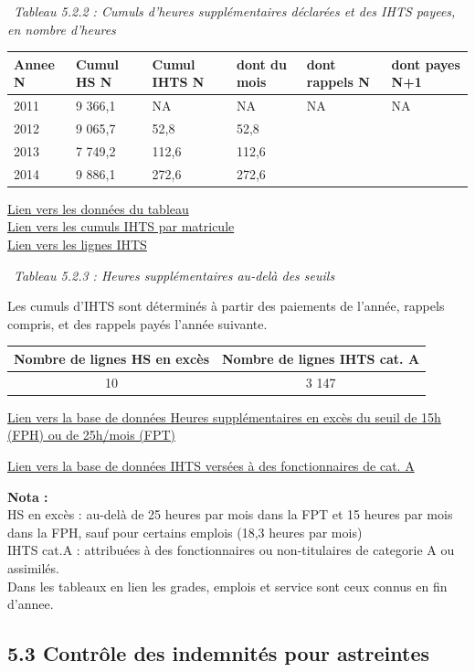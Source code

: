 ~\emph{Tableau 5.2.2 : Cumuls d'heures supplémentaires déclarées et des
IHTS payees, en nombre d'heures}

\begin{longtable}[]{@{}llllll@{}}
\toprule
Annee N & Cumul HS N & Cumul IHTS N & dont du mois & dont rappels N &
dont payes N+1\tabularnewline
\midrule
\endhead
2011 & 9 366,1 & NA & NA & NA & NA\tabularnewline
2012 & 9 065,7 & 52,8 & 52,8 & &\tabularnewline
2013 & 7 749,2 & 112,6 & 112,6 & &\tabularnewline
2014 & 9 886,1 & 272,6 & 272,6 & &\tabularnewline
\bottomrule
\end{longtable}

\href{../Bases/Reglementation/CumHS.csv}{Lien vers les données du
tableau}\\
\href{../Bases/Reglementation/lignes.IHTS.tot.csv}{Lien vers les cumuls
IHTS par matricule}\\
\href{../Bases/Reglementation/lignes.IHTS.csv}{Lien vers les lignes IHTS}

~\emph{Tableau 5.2.3 : Heures supplémentaires au-delà des seuils}

Les cumuls d'IHTS sont déterminés à partir des paiements de l'année,
rappels compris, et des rappels payés l'année suivante.

\begin{longtable}[]{@{}cc@{}}
\toprule
Nombre de lignes HS en excès & Nombre de lignes IHTS cat.
A\tabularnewline
\midrule
\endhead
10 & 3 147\tabularnewline
\bottomrule
\end{longtable}

\href{../Bases/Reglementation/HS.sup.25.csv}{Lien vers la base de données
Heures supplémentaires en excès du seuil de 15h (FPH) ou de 25h/mois
(FPT)}

\href{../Bases/Reglementation/ihts.cat.A.csv}{Lien vers la base de données
IHTS versées à des fonctionnaires de cat. A}

\textbf{Nota :}\\
HS en excès : au-delà de 25 heures par mois dans la FPT et 15 heures par
mois dans la FPH, sauf pour certains emplois (18,3 heures par mois)\\
IHTS cat.A : attribuées à des fonctionnaires ou non-titulaires de
categorie A ou assimilés.\\
Dans les tableaux en lien les grades, emplois et service sont ceux
connus en fin d'annee.

\hypertarget{controle-des-indemnites-pour-astreintes}{%
\subsection{5.3 Contrôle des indemnités pour
astreintes}\label{controle-des-indemnites-pour-astreintes}}


